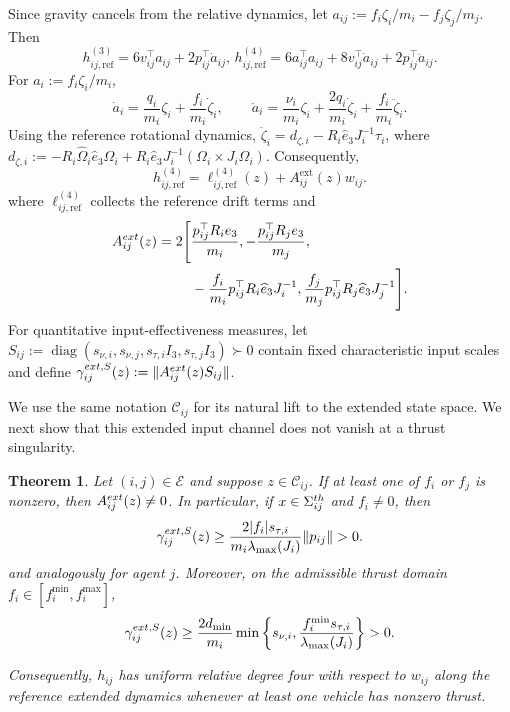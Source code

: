 \documentclass[10pt,a4paper]{amsart}
\newtheorem{theorem}{Theorem}[section]
\begin{document}
Since gravity cancels from the relative dynamics, let
$a_{ij}:=f_i\zeta_i/m_i-f_j\zeta_j/m_j$. Then
\[
h_{ij,\mathrm{ref}}^{(3)}
=6v_{ij}^\top a_{ij}+2p_{ij}^\top\dot a_{ij},
\,
h_{ij,\mathrm{ref}}^{(4)}
=6a_{ij}^\top a_{ij}
+8v_{ij}^\top\dot a_{ij}
+2p_{ij}^\top\ddot a_{ij}.
\]
For $a_i:=f_i\zeta_i/m_i$,
\[
\dot a_i
=\frac{q_i}{m_i}\zeta_i+\frac{f_i}{m_i}\dot\zeta_i,
\qquad
\ddot a_i
=\frac{\nu_i}{m_i}\zeta_i
+\frac{2q_i}{m_i}\dot\zeta_i
+\frac{f_i}{m_i}\ddot\zeta_i.
\]
Using the reference rotational dynamics,
$\ddot\zeta_i=d_{\zeta,i}
-R_i\widehat e_3J_i^{-1}\tau_i$, where
$d_{\zeta,i}:=
-R_i\widehat\Omega_i\widehat e_3\Omega_i
+R_i\widehat e_3J_i^{-1}
(\Omega_i\times J_i\Omega_i)$. Consequently,
\begin{equation}
    h_{ij,\mathrm{ref}}^{(4)}
    =
    \ell_{ij,\mathrm{ref}}^{(4)}(z)
    +
    A_{ij}^{\mathrm{ext}}(z)w_{ij}.
    \label{eq:h4_affine}
\end{equation}
where $\ell_{ij,\mathrm{ref}}^{(4)}$ collects the reference drift terms and
\begin{equation}
\begin{aligned}
A_{ij}^{\rm ext}(z)
=
2\Bigg[
&\frac{p_{ij}^{\top}R_ie_3}{m_i},
-\frac{p_{ij}^{\top}R_je_3}{m_j},\\
&-\frac{f_i}{m_i}
 p_{ij}^{\top}R_i\widehat e_3J_i^{-1},
\frac{f_j}{m_j}
 p_{ij}^{\top}R_j\widehat e_3J_j^{-1}
\Bigg].
\end{aligned}
\label{eq:Aext}
\end{equation}
For quantitative input-effectiveness measures, let
$S_{ij}:=\operatorname{diag}
(s_{\nu,i},s_{\nu,j},s_{\tau,i}I_3,s_{\tau,j}I_3)\succ0$
contain fixed characteristic input scales and define
$\gamma_{ij}^{\rm ext,S}(z):=
\|A_{ij}^{\rm ext}(z)S_{ij}\|$.

 We use the same notation $\mathcal C_{ij}$ for its natural lift to the extended state space. We next show that this
extended input channel does not vanish at a thrust singularity.




\begin{theorem}
\label{thm:singularity_removal}
Let $(i,j)\in\mathcal E$ and suppose
$z\in\mathcal C_{ij}$. If at least one of $f_i$ or $f_j$
is nonzero, then $A_{ij}^{\rm ext}(z)\neq0$. In particular,
if $x\in\Sigma_{ij}^{\rm th}$ and $f_i\neq0$, then
\begin{equation}
    \gamma_{ij}^{\rm ext,S}(z)
\ge
\frac{2|f_i|s_{\tau,i}}
{m_i\lambda_{\max}(J_i)}
\|p_{ij}\|>0.
    \label{eq:gamma_ext_bound}
\end{equation}
and analogously for agent $j$. Moreover, on the admissible
thrust domain $f_i\in[f_i^{\min},f_i^{\max}]$,
\begin{equation}
\gamma_{ij}^{\rm ext,S}(z)
\ge
\frac{2d_{\min}}{m_i}
\min\left\{
s_{\nu,i},
\frac{f_i^{\min}s_{\tau,i}}
{\lambda_{\max}(J_i)}
\right\}
>0.
\label{eq:gamma_ext_uniform_bound}
\end{equation}

Consequently,
$h_{ij}$ has uniform relative degree four
with respect to $w_{ij}$ along the reference extended dynamics
whenever at least one vehicle has nonzero thrust.
\end{theorem}
\end{document}
